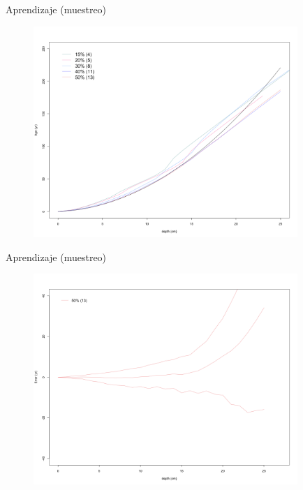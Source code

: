 \documentclass{beamer}
\begin{document}
\begin{frame}{Aprendizaje (muestreo)}
 	\begin{figure}
		\begin{centering}
			\includegraphics[width=10cm]{./Figures/Chrono_ssize.png}
			\caption{}
			\label{}
		\end{centering}
	\end{figure}
\end{frame} 


\begin{frame}{Aprendizaje (muestreo)}
 	\begin{figure}
		\begin{centering}
			\includegraphics[width=10cm]{./Figures/Chrono_ssize_difsd50.png}
			\caption{}
			\label{}
		\end{centering}
	\end{figure}
\end{frame} 
\end{document}
